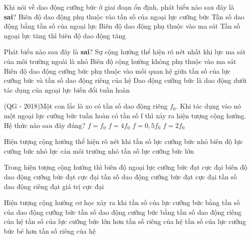 \begin{ex}%
Khi nói về dao động cưỡng bức ở giai đoạn ổn định, phát biểu nào sau đây là \textbf{sai}?
\choice
{Biên độ dao động phụ thuộc vào tần số của ngoại lực cưỡng bức}
{Tần số dao động bằng tần số của ngoại lực}
{Biên độ dao động phụ thuộc vào ma sát}
{\True Tần số ngoại lực tăng thì biên độ dao động tăng}
\end{ex} 
\begin{ex}%
Phát biểu nào sau đây là \textbf{sai}?
\choice
{Sự cộng hưởng thể hiện rõ nét nhất khi lực ma sát của môi trường ngoài là nhỏ}
{\True Biên độ cộng hưởng không phụ thuộc vào ma sát}
{Biên độ dao động cưỡng bức phụ thuộc vào mối quan hệ giữa tần số của lực cưỡng bức và tần số dao động riêng của hệ}
{Dao động cưỡng bức là dao động dưới tác dụng của ngoại lực biến đổi tuần hoàn}
\end{ex} 
\begin{ex} %
(QG - 2018)Một con lắc lò xo có tần số dao động riêng $f_0$. Khi tác dụng vào nó một ngoại lực cưỡng bức tuần hoàn có tần số f thì xảy ra hiện tượng cộng hưởng. Hệ thức nào sau đây đúng?
\choice
{\True $f = f_0$}
{$f = 4f_0$}
{$f = 0,5f_0$}
{$f = 2f_0$}
\end{ex} 
\begin{ex}%
Hiện tượng cộng hưởng thể hiện rõ nét khi
\choice
{tần số lực cưỡng bức nhỏ}
{biên độ lực cưỡng bức nhỏ}
{\True lực cản môi trường nhỏ}
{tần số lực cưỡng bức lớn}
\end{ex} 
\begin{ex}%
Trong hiện tượng cộng hưởng thì
\choice
{biên độ ngoại lực cưỡng bức đạt cực đại}
{\True biên độ dao động cưỡng bức đạt cực đại}
{tần số dao động cưỡng bức đạt cực đại}
{tần số dao động riêng đạt giá trị cực đại}
\end{ex} 
\begin{ex}%
Hiện tượng cộng hưởng cơ học xảy ra khi
\choice
{tần số của lực cưỡng bức bằng tần số của dao động cưỡng bức}
{\True tần số dao động cưỡng bức bằng tần số dao động riêng của hệ}
{tần số của lực cưỡng bức lớn hơn tần số riêng của hệ}
{tần số của lực cưỡng bức bé hơn tần số riêng của hệ}
\end{ex} 


